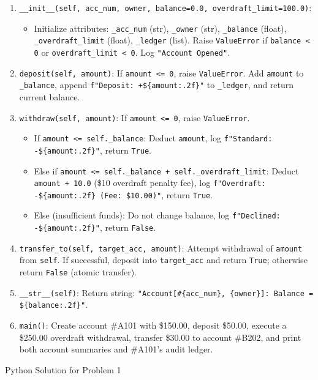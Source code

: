 \documentclass[11pt,a4paper]{article}
\begin{document}
\begin{enumerate}[label=\arabic*.,leftmargin=2em,itemsep=1.2pt]
\item \texttt{\_\_init\_\_(self, acc\_num, owner, balance=0.0, overdraft\_limit=100.0)}:
  \begin{itemize}
  \item Initialize attributes: \texttt{\_acc\_num} (str), \texttt{\_owner} (str), \texttt{\_balance} (float), \texttt{\_overdraft\_limit} (float), \texttt{\_ledger} (list). Raise \texttt{ValueError} if \texttt{balance < 0} or \texttt{overdraft\_limit < 0}. Log \texttt{"Account Opened"}.
  \end{itemize}
\item \texttt{deposit(self, amount)}: If \texttt{amount <= 0}, raise \texttt{ValueError}. Add \texttt{amount} to \texttt{\_balance}, append \texttt{f"Deposit: +\$\{amount:.2f\}"} to \texttt{\_ledger}, and return current balance.
\item \texttt{withdraw(self, amount)}: If \texttt{amount <= 0}, raise \texttt{ValueError}.
  \begin{itemize}
  \item If \texttt{amount <= self.\_balance}: Deduct \texttt{amount}, log \texttt{f"Standard: -\$\{amount:.2f\}"}, return \texttt{True}.
  \item Else if \texttt{amount <= self.\_balance + self.\_overdraft\_limit}: Deduct \texttt{amount + 10.0} (\$10 overdraft penalty fee), log \texttt{f"Overdraft: -\$\{amount:.2f\} (Fee: \$10.00)"}, return \texttt{True}.
  \item Else (insufficient funds): Do not change balance, log \texttt{f"Declined: -\$\{amount:.2f\}"}, return \texttt{False}.
  \end{itemize}
\item \texttt{transfer\_to(self, target\_acc, amount)}: Attempt withdrawal of \texttt{amount} from \texttt{self}. If successful, deposit into \texttt{target\_acc} and return \texttt{True}; otherwise return \texttt{False} (atomic transfer).
\item \texttt{\_\_str\_\_(self)}: Return string: \texttt{"Account[\#\{acc\_num\}, \{owner\}]: Balance = \$\{balance:.2f\}"}.
\item \texttt{main()}: Create account \#A101 with \$150.00, deposit \$50.00, execute a \$250.00 overdraft withdrawal, transfer \$30.00 to account \#B202, and print both account summaries and \#A101's audit ledger.
\end{enumerate}
\begin{answerbox}[height=8.5cm]{Python Solution for Problem 1}\end{answerbox}
\newpage
\end{document}
